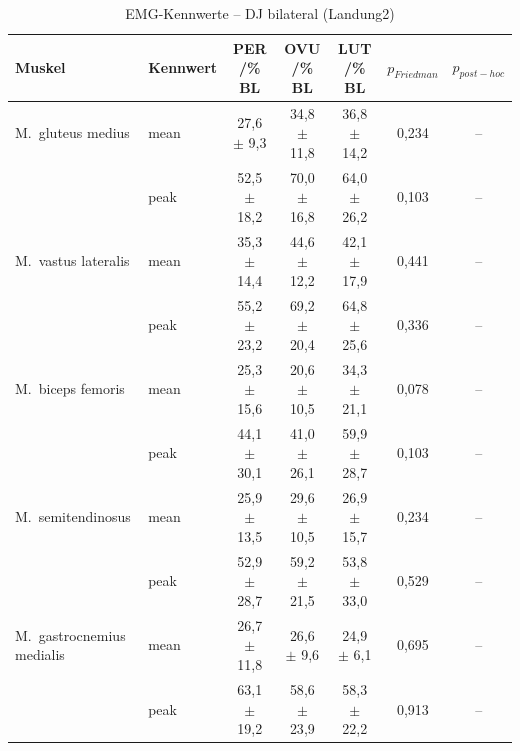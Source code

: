 \begin{table}[H]
  \centering
  \caption{EMG-Kennwerte – DJ bilateral (Landung2)}
  \label{tab:DJ_bilateral_Landung2}
  \small
  \begin{tabular}{l l c c c c c }
    \hline
\textbf{Muskel} & \textbf{Kennwert} & \textbf{PER /\% BL} & \textbf{OVU /\% BL} & \textbf{LUT /\% BL} & \textbf{$p_{Friedman}$} & \textbf{$p_{post-hoc}$} \\
    \hline
    M.~gluteus medius & mean & 27{,}6 $\pm$ 9{,}3 & 34{,}8 $\pm$ 11{,}8 & 36{,}8 $\pm$ 14{,}2 & 0{,}234 & --\\
     & peak & 52{,}5 $\pm$ 18{,}2 & 70{,}0 $\pm$ 16{,}8 & 64{,}0 $\pm$ 26{,}2 & 0{,}103 & --\\
    \hline
    M.~vastus lateralis & mean & 35{,}3 $\pm$ 14{,}4 & 44{,}6 $\pm$ 12{,}2 & 42{,}1 $\pm$ 17{,}9 & 0{,}441 & --\\
     & peak & 55{,}2 $\pm$ 23{,}2 & 69{,}2 $\pm$ 20{,}4 & 64{,}8 $\pm$ 25{,}6 & 0{,}336 & --\\
    \hline
    M.~biceps femoris & mean & 25{,}3 $\pm$ 15{,}6 & 20{,}6 $\pm$ 10{,}5 & 34{,}3 $\pm$ 21{,}1 & 0{,}078 & --\\
     & peak & 44{,}1 $\pm$ 30{,}1 & 41{,}0 $\pm$ 26{,}1 & 59{,}9 $\pm$ 28{,}7 & 0{,}103 & --\\
    \hline
    M.~semitendinosus & mean & 25{,}9 $\pm$ 13{,}5 & 29{,}6 $\pm$ 10{,}5 & 26{,}9 $\pm$ 15{,}7 & 0{,}234 & --\\
     & peak & 52{,}9 $\pm$ 28{,}7 & 59{,}2 $\pm$ 21{,}5 & 53{,}8 $\pm$ 33{,}0 & 0{,}529 & --\\
    \hline
    M.~gastrocnemius medialis & mean & 26{,}7 $\pm$ 11{,}8 & 26{,}6 $\pm$ 9{,}6 & 24{,}9 $\pm$ 6{,}1 & 0{,}695 & --\\
     & peak & 63{,}1 $\pm$ 19{,}2 & 58{,}6 $\pm$ 23{,}9 & 58{,}3 $\pm$ 22{,}2 & 0{,}913 & --\\
    \hline
  \end{tabular}
\end{table}

